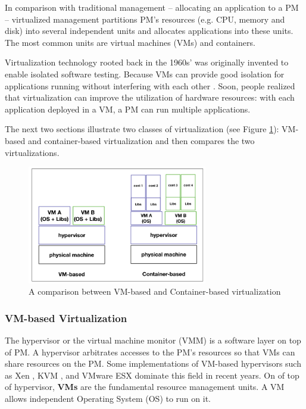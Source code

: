  In comparison with traditional management -- allocating an application to a PM -- virtualized management partitions PM's resources (e.g. CPU, memory and disk) into several independent units and allocates applications into these units. 
The most common units are virtual machines (VMs) and containers.

Virtualization technology rooted back in the 1960s' was originally invented to enable isolated software testing. Because VMs can provide good isolation for applications running without interfering with each other \cite{Somani:2009ho}. Soon, people realized that virtualization can improve the utilization of hardware resources: with each application deployed in a VM, a PM can run multiple applications. 

The next two sections illustrate two classes of virtualization (see Figure \ref{fig:comparison}): VM-based and container-based virtualization and then compares the two virtualizations.

\begin{figure}
	\centering
	\includegraphics[width=0.7\textwidth]{pics/comparison.png}
	\caption{A comparison between VM-based and Container-based virtualization \cite{Piraghaj:2016bw}}
	\label{fig:comparison}
\end{figure}

\subsubsection{VM-based Virtualization} 

The hypervisor or the virtual machine monitor (VMM) is a software layer on top of PM. A hypervisor arbitrates accesses to the PM's resources so that VMs can share resources on the PM. Some implementations of VM-based hypervisors such as Xen \cite{Barham:2003cj}, KVM \cite{Kivity:2007wu}, and VMware ESX \cite{Waldspurger:2002db} dominate this field in recent years. On of top of hypervisor, \textbf{VMs} are the fundamental resource management units. A VM allows independent Operating System (OS) to run on it.  

